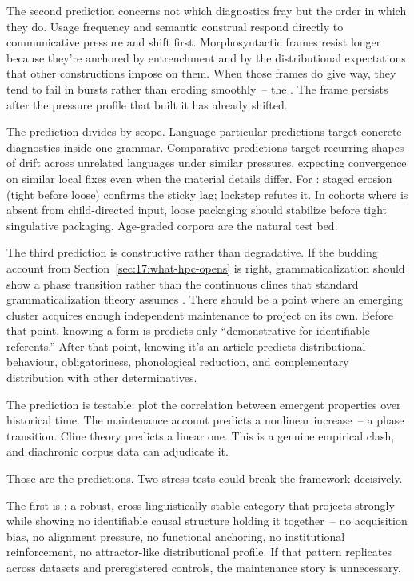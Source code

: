 The second prediction concerns not which diagnostics fray but the order in which they do. Usage frequency and semantic construal respond directly to communicative pressure and shift first. Morphosyntactic frames resist longer because they're anchored by entrenchment and by the distributional expectations that other constructions impose on them. When those frames do give way, they tend to fail in bursts rather than eroding smoothly~-- the . The frame persists after the pressure profile that built it has already shifted.

The prediction divides by scope. Language-particular predictions target concrete diagnostics inside one grammar. Comparative predictions target recurring shapes of drift across unrelated languages under similar pressures, expecting convergence on similar local fixes even when the material details differ. For : staged erosion (tight before loose) confirms the sticky lag; lockstep refutes it. In cohorts where  is absent from child-directed input, loose packaging should stabilize before tight singulative packaging. Age-graded corpora are the natural test bed.

The third prediction is constructive rather than degradative. If the budding account from Section~\ref{sec:17:what-hpc-opens} is right, grammaticalization should show a phase transition rather than the continuous clines that standard grammaticalization theory assumes \citep{hopper1993}. There should be a point where an emerging cluster acquires enough independent maintenance to project on its own. Before that point, knowing a form is  predicts only \enquote{demonstrative for identifiable referents.} After that point, knowing it's an article predicts distributional behaviour, obligatoriness, phonological reduction, and complementary distribution with other determinatives.

The prediction is testable: plot the correlation between emergent properties over historical time. The maintenance account predicts a nonlinear increase~-- a phase transition. Cline theory predicts a linear one. This is a genuine empirical clash, and diachronic corpus data can adjudicate it.

Those are the predictions. Two stress tests could break the framework decisively.

The first is : a robust, cross-linguistically stable category that projects strongly while showing no identifiable causal structure holding it together~-- no acquisition bias, no alignment pressure, no functional anchoring, no institutional reinforcement, no attractor-like distributional profile. If that pattern replicates across datasets and preregistered controls, the maintenance story is unnecessary.

